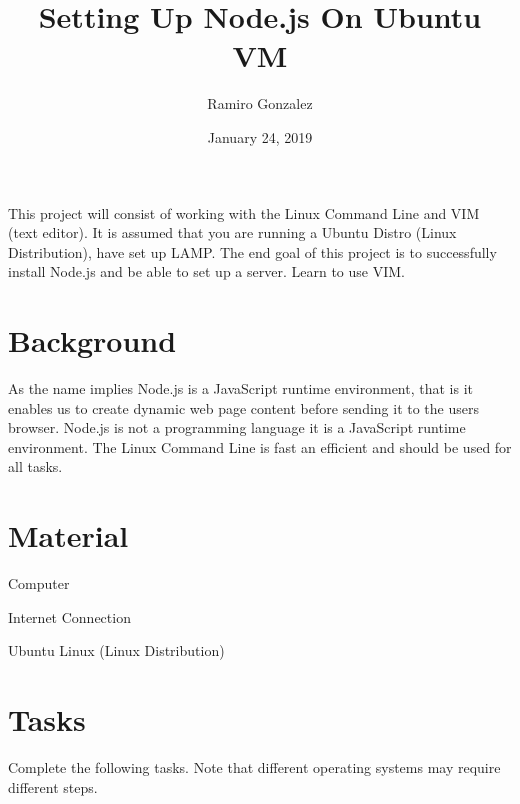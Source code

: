 \documentclass[12pt]{article}
\begin{document}
\title{ Setting Up Node.js On Ubuntu VM}
\author{Ramiro Gonzalez}
\date{January 24, 2019}

\maketitle

\begin{Objective}
	This project will consist of working with the Linux Command Line and VIM (text editor). It is assumed that you are running a Ubuntu Distro (Linux Distribution), have set up LAMP. The end goal of this project is to successfully install Node.js and be able to set up a server. Learn to use VIM. 
\end{Objective}

\section*{Background}
	As the name implies Node.js is a JavaScript runtime environment, that is it enables us to create dynamic web page content before sending it to the users browser. Node.js is not a programming language it is a JavaScript runtime environment. The Linux Command Line is fast an efficient and should be used for all tasks.  
\section*{Material}
 \color{black}
\begin{todolist}
    \item Computer 
    \item Internet Connection
    \item Ubuntu Linux (Linux Distribution) 
\end{todolist}
\section{Tasks}
Complete the following tasks. Note that different operating systems may require different steps. 
\end{document}
